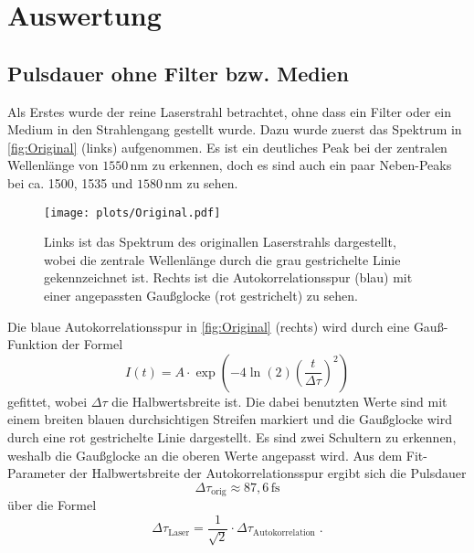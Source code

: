 \newpage
\section{Auswertung}
\label{sec:auswertung}
\subsection{Pulsdauer ohne Filter bzw. Medien}
    Als Erstes wurde der reine Laserstrahl betrachtet, ohne dass ein Filter oder ein Medium in den Strahlengang gestellt wurde.
    Dazu wurde zuerst das Spektrum in \autoref{fig:Original} (links) aufgenommen.
    Es ist ein deutliches Peak bei der zentralen Wellenlänge von $1550\,\si{\nano\meter}$ zu erkennen, doch es sind auch ein paar Neben-Peaks bei ca. 1500, 1535 und $1580\,\si{\nano\meter}$ zu sehen.
    \vspace*{-0.3cm}
    \begin{figure}[ht]
        \centering\captionsetup{format=plain}
        \texttt{[image: plots/Original.pdf]} \vspace*{-0.5cm}
        \caption{Links ist das Spektrum des originallen Laserstrahls dargestellt, wobei die zentrale Wellenlänge durch die grau gestrichelte Linie gekennzeichnet ist. Rechts ist die Autokorrelationsspur (blau) mit einer angepassten Gaußglocke (rot gestrichelt) zu sehen.}
        \label{fig:Original}
    \end{figure}
    \FloatBarrier
    Die blaue Autokorrelationsspur in \autoref{fig:Original} (rechts) wird durch eine Gauß-Funktion der Formel
    \begin{equation}
        I(t) = A \cdot \exp\left(-4\ln(2)\left(\frac{t}{\Delta\tau}\right)^2\right)
    \end{equation}
    gefittet, wobei $\Delta\tau$ die Halbwertsbreite ist.
    Die dabei benutzten Werte sind mit einem breiten blauen durchsichtigen Streifen markiert und die Gaußglocke wird durch eine rot gestrichelte Linie dargestellt.
    Es sind zwei Schultern zu erkennen, weshalb die Gaußglocke an die oberen Werte angepasst wird.
    Aus dem Fit-Parameter der Halbwertsbreite der Autokorrelationsspur ergibt sich die Pulsdauer
    \begin{equation*}
        \Delta \tau_{\mathrm{orig}} \approx 87,6\,\si{\femto\second}
    \end{equation*}
    über die Formel
    \begin{equation}
        \Delta \tau_{\mathrm{Laser}} = \frac{1}{\sqrt{2}} \cdot \Delta \tau_{\mathrm{Autokorrelation}}\;.
    \end{equation}

